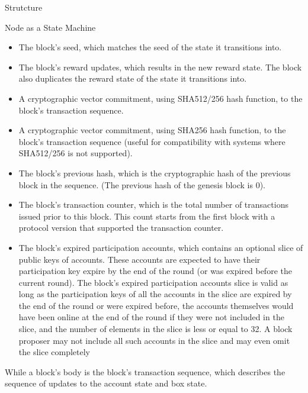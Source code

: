 \documentclass[10pt,a4paper]{article}
\begin{document}
\begin{section}{Strutcture}
\begin{subsection}{Node as a State Machine}
\begin{itemize}
    \item
    The block's seed, which matches the seed of the state it transitions into.
    
    \item
    The block's reward updates, which results in the new reward state. The
    block also duplicates the reward state of the state it transitions into.
    
    \item
    A cryptographic vector commitment, using SHA512/256 hash function,
    to the block's transaction sequence.
    
    \item
    A cryptographic vector commitment, using SHA256 hash function, to the block's
    transaction sequence (useful for compatibility with systems where SHA512/256 
    is not supported).
    
    \item
    The block's previous hash, which is the cryptographic hash of the previous
    block in the sequence. (The previous hash of the genesis block is 0).
    
    \item
    The block's transaction counter, which is the total number of transactions
    issued prior to this block. This count starts from the first block with a
    protocol version that supported the transaction counter.
    
    \item
    The block's expired participation accounts, which contains an optional slice
    of public keys of accounts. These accounts are expected to have their
    participation key expire by the end of the round (or was expired before
    the current round).
    The block's expired participation accounts slice is valid as long as the participation keys 
    of all the accounts in the slice are expired by the end of the round or
    were expired before, the accounts themselves would have been online at the end
    of the round if they were not included in the slice, and the number of elements
    in the slice is less or equal to 32. A block proposer may not include all such
    accounts in the slice and may even omit the slice completely
\end{itemize}
While a block's body is the block's transaction sequence, which describes the sequence
of updates to the account state and box state.
%


\end{subsection}
\end{section}
\end{document}
